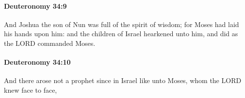 		\paragraph{Deuteronomy 34:9} %
			\label{DEUTERONOMY-34-9}

			And Joshua the son of Nun was full of the spirit of wisdom; for Moses had laid his hands upon him: and the children of Israel hearkened unto him, and did as the LORD commanded Moses.


		\paragraph{Deuteronomy 34:10} %
			\label{DEUTERONOMY-34-10}

			And there arose not a prophet since in Israel like unto Moses, whom the LORD knew face to face,


